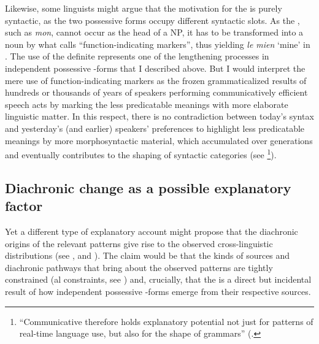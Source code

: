 \documentclass[output=paper]{langsci/langscibook}
\begin{document}
Likewise, some linguists might argue that the motivation for the  is purely syntactic, as the two possessive forms occupy different syntactic slots. As the , such as  \textit{mon}, cannot occur as the head of a NP, it has to be transformed into a noun by what \citet[58f.]{Croft1991_Cat} calls “function-indicating markers”, thus yielding \textit{le mien} ‘mine’ in . The use of the definite  represents one of the lengthening processes in independent possessive -forms that I described above. But I would interpret the mere use of function-indicating markers as the frozen grammaticalized results of hundreds or thousands of years of speakers performing communicatively efficient speech acts by marking the less predicatable meanings with more elaborate linguistic matter. In this respect, there is no contradiction between today’s syntax and yesterday’s (and earlier) speakers' preferences to highlight less predicatable meanings by more morphosyntactic material, which accumulated over generations and eventually contributes to the shaping of syntactic categories (see \citealt[171]{NorcliffeJaeger2016}\footnote{“Communicative  therefore holds explanatory potential not just for patterns of real-time language use, but also for the shape of grammars” (\citealt[171]{NorcliffeJaeger2016}.}). 


\subsection{ Diachronic change as a possible explanatory factor}

Yet a different type of explanatory account might propose that the diachronic origins of the relevant patterns give rise to the observed cross-linguistic distributions (see \citealt{Cristofaro2017}, and ). The claim would be that the kinds of sources and diachronic pathways that bring about the observed patterns are tightly constrained (al constraints, see ) and, crucially, that the  is a direct but incidental result of how independent possessive -forms emerge from their respective sources. 
\end{document}

